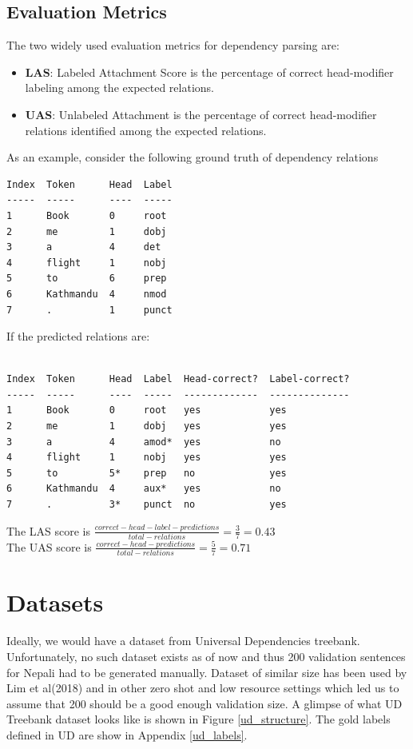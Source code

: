 \subsection{Evaluation Metrics}
The two widely used evaluation metrics for dependency parsing are:
\begin{itemize}
    \item \textbf{LAS}: Labeled Attachment Score is the percentage of correct head-modifier labeling among the expected relations.
    \item \textbf{UAS}: Unlabeled Attachment is the percentage of correct head-modifier relations identified among the expected relations.
\end{itemize}
As an example, consider the following ground truth of dependency relations
\begin{verbatim}
Index  Token      Head  Label
-----  -----      ----  -----
1      Book       0     root
2      me         1     dobj
3      a          4     det
4      flight     1     nobj
5      to         6     prep
6      Kathmandu  4     nmod
7      .          1     punct
\end{verbatim}
If the predicted relations are:
\\~\\
\begin{verbatim}
Index  Token      Head  Label  Head-correct?  Label-correct?
-----  -----      ----  -----  -------------  --------------
1      Book       0     root   yes            yes
2      me         1     dobj   yes            yes
3      a          4     amod*  yes            no
4      flight     1     nobj   yes            yes
5      to         5*    prep   no             yes
6      Kathmandu  4     aux*   yes            no
7      .          3*    punct  no             yes
\end{verbatim}
The LAS score is $\frac{correct-head-label-predictions}{total-relations} = \frac{3}{7} = 0.43$\\
The UAS score is $\frac{correct-head-predictions}{total-relations} = \frac{5}{7} = 0.71$

\section{Datasets}
Ideally, we would have a dataset from Universal Dependencies treebank.
Unfortunately, no such dataset exists as of now and thus 200 validation
sentences for Nepali had to be generated manually. Dataset of similar size has
been used by Lim et al(2018)\cite{multilingualCaseStudy} and in other zero shot
and low resource settings\cite{udapter}\cite{zero-shot} which led us to assume
that 200 should be a good enough validation size. A glimpse of what UD Treebank
dataset looks like is shown in Figure \ref{ud_structure}. The gold labels
defined in UD are show in Appendix \ref{ud_labels}.


